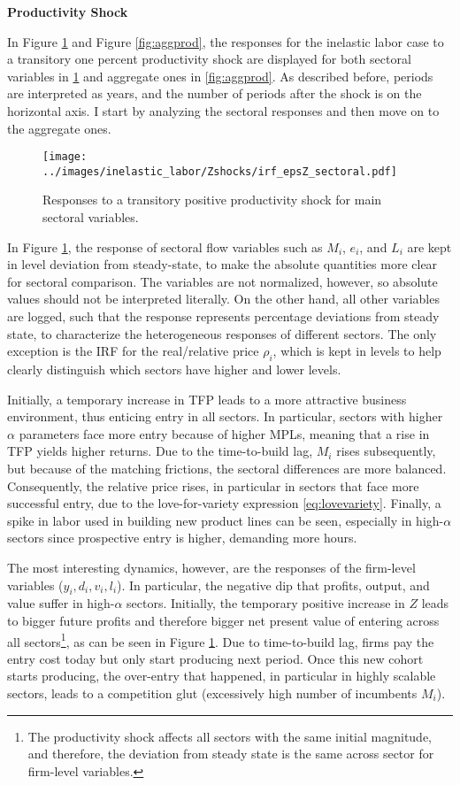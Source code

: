 \documentclass[a4paper,12pt]{article} %
\numberwithin{equation}{section} %
\numberwithin{figure}{section}
\numberwithin{table}{section}
\begin{document}
\medskip
\medskip
\noindent\textbf{Productivity Shock}
\medskip

In Figure \ref{fig:multiprod} and Figure \ref{fig:aggprod}, the responses for the inelastic labor case
to a transitory one percent productivity shock are displayed for both sectoral variables in 
\ref{fig:multiprod} and aggregate ones in \ref{fig:aggprod}. As described before, periods are interpreted as years,
and the number of periods after the shock is on the horizontal axis. I start by analyzing the sectoral responses and
then move on to the aggregate ones. 

\begin{figure}[H]
  \centering
  \texttt{[image: ../images/inelastic\_labor/Zshocks/irf\_epsZ\_sectoral.pdf]}
  \caption{Responses to a transitory positive productivity shock for main sectoral variables.}
  \label{fig:multiprod}
\end{figure}

In Figure \ref{fig:multiprod}, the response of sectoral flow variables such as $M_i$, $e_i$, and $L_i$ are kept in level
deviation from steady-state, to make the absolute quantities more clear for sectoral comparison. The variables are not normalized, however,
so absolute values should not be interpreted literally. On the other hand, all other
variables are logged, such that the response represents percentage deviations from steady state, to characterize the heterogeneous
responses of different sectors. The only exception is the IRF for the real/relative price $\rho_i$, which is 
kept in levels to help clearly distinguish which sectors have higher and lower levels.

Initially, a temporary increase in TFP leads to a more attractive business environment, thus enticing
entry in all sectors. In particular, sectors with higher $\alpha$ parameters face more entry because of higher MPLs,
meaning that a rise in TFP yields higher returns. Due to the time-to-build lag, $M_i$ rises subsequently, but because
of the matching frictions, the sectoral differences are more balanced. Consequently, the relative price rises, in particular in
sectors that face more successful entry, due to the love-for-variety expression \eqref{eq:lovevariety}. Finally, a spike in
labor used in building new product lines can be seen, especially in high-$\alpha$ sectors since prospective entry is higher, demanding more
hours.

The most interesting dynamics, however, are the responses of the firm-level variables ($y_i,d_i,v_i,l_i$). In particular, the
negative dip that profits, output, and value suffer in high-$\alpha$ sectors. Initially, the temporary positive 
increase in $Z$ leads to bigger future profits and therefore bigger net present value of entering across all sectors\footnote{The productivity shock affects
all sectors with the same initial magnitude, and therefore, the deviation from steady state is the same across sector for firm-level variables.}, as can be
seen in Figure \ref{fig:multiprod}. Due to time-to-build lag, firms pay the entry cost today but only start producing
next period. Once this new cohort starts producing, the over-entry that happened, in particular in highly scalable sectors, leads
to a competition glut (excessively high number of incumbents $M_i$). 
\end{document}

